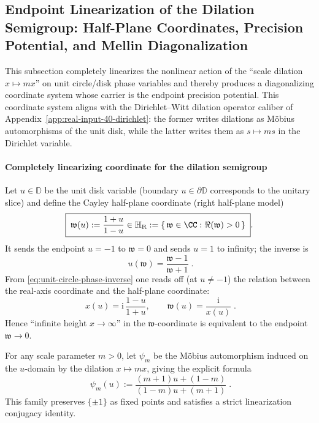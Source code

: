 \subsection{Endpoint Linearization of the Dilation Semigroup: Half-Plane Coordinates, Precision Potential, and Mellin Diagonalization}\label{subsec:unit-circle-scale-linearization}
This subsection completely linearizes the nonlinear action of the ``scale dilation \(x\mapsto mx\)'' on unit circle/disk phase variables and thereby produces a diagonalizing coordinate system whose carrier is the endpoint precision potential.
This coordinate system aligns with the Dirichlet--Witt dilation operator caliber of Appendix~\ref{app:real-input-40-dirichlet}: the former writes dilations as M\"obius automorphisms of the unit disk, while the latter writes them as \(s\mapsto ms\) in the Dirichlet variable.

\paragraph{Completely linearizing coordinate for the dilation semigroup}
Let \(u\in\mathbb{D}\) be the unit disk variable (boundary \(u\in\partial\mathbb{D}\) corresponds to the unitary slice) and define the Cayley half-plane coordinate (right half-plane model)
\begin{equation}\label{eq:scale-linearization-halfplane-coordinate}
\boxed{\;
\mathfrak{w}(u):=\frac{1+u}{1-u}\in\mathbb{H}_{\mathrm{R}}:=\{\,\mathfrak{w}\in\CC:\Re(\mathfrak{w})>0\,\}\; }.
\end{equation}
It sends the endpoint \(u=-1\) to \(\mathfrak{w}=0\) and sends \(u=1\) to infinity; the inverse is
\begin{equation}\label{eq:scale-linearization-halfplane-inverse}
\boxed{\;u(\mathfrak{w})=\frac{\mathfrak{w}-1}{\mathfrak{w}+1}\; }.
\end{equation}
From \eqref{eq:unit-circle-phase-inverse} one reads off (at \(u\neq-1\)) the relation between the real-axis coordinate and the half-plane coordinate:
\begin{equation}\label{eq:scale-linearization-w-vs-x}
\boxed{\;
x(u)=\mathrm{i}\,\frac{1-u}{1+u},
\qquad
\mathfrak{w}(u)=\frac{\mathrm{i}}{x(u)}\; }.
\end{equation}
Hence ``infinite height \(x\to\infty\)'' in the \(\mathfrak{w}\)-coordinate is equivalent to the endpoint \(\mathfrak{w}\to 0\).

\medskip
For any scale parameter \(m>0\), let \(\psi_m\) be the M\"obius automorphism induced on the \(u\)-domain by the dilation \(x\mapsto mx\), giving the explicit formula
\begin{equation}\label{eq:scale-psi-m}
\boxed{\;
\psi_m(u):=\frac{(m+1)u+(1-m)}{(1-m)u+(m+1)}\; }.
\end{equation}
This family preserves \(\{\pm 1\}\) as fixed points and satisfies a strict linearization conjugacy identity.

